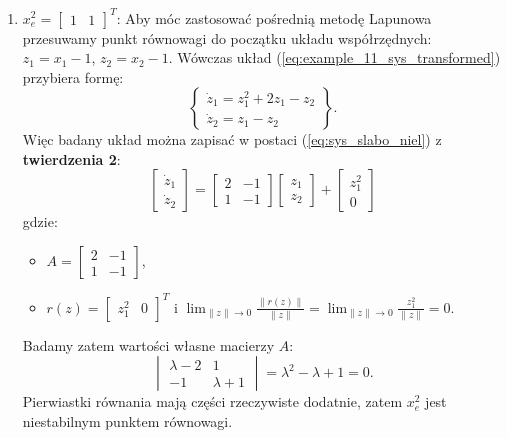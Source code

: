 \documentclass{article}
\begin{document}
\begin{enumerate}
            \item $x_{e}^{2} = \begin{bmatrix} 1 & 1 \end{bmatrix}^{T}$: Aby móc zastosować pośrednią metodę Lapunowa przesuwamy punkt równowagi do początku układu współrzędnych: $z_{1} = x_{1} - 1$, $z_{2} = x_{2} - 1$. Wówczas układ (\ref{eq:example_11_sys_transformed}) przybiera formę:
            $$
                \left\{
                \begin{array}{l}
                     \dot{z}_{1} = z_{1}^{2} + 2z_{1} - z_{2}\\
                     \dot{z}_{2} = z_{1} - z_{2}
                \end{array}
                \right\}.
            $$
            Więc badany układ można zapisać w postaci (\ref{eq:sys_slabo_niel}) z \textbf{twierdzenia 2}:
            $$
                \begin{bmatrix} \dot{z}_{1} \\ \dot{z}_{2} \end{bmatrix}
                =
                \begin{bmatrix} 2 & -1 \\ 1 & -1 \end{bmatrix}
                \begin{bmatrix} z_{1} \\ z_{2} \end{bmatrix}
                +
                \begin{bmatrix} z_{1}^{2} \\ 0 \end{bmatrix}
            $$
            gdzie:
            \begin{itemize}
                \item $A = \begin{bmatrix} 2 & -1 \\ 1 & -1 \end{bmatrix}$,
                \item $r(z) = \begin{bmatrix} z_{1}^{2} & 0 \end{bmatrix}^{T}$ i $\lim_{\lVert z \rVert \rightarrow 0}\frac{\lVert r(z) \rVert}{\lVert z \rVert} = \lim_{\lVert z \rVert \rightarrow 0}\frac{z_{1}^{2}}{\lVert z \rVert} = 0$.
            \end{itemize}
            Badamy zatem wartości własne macierzy $A$:
            $$
                \begin{vmatrix} \lambda-2 & 1\\ -1 & \lambda + 1 \end{vmatrix} = \lambda^{2} - \lambda + 1 = 0.
            $$
            Pierwiastki równania mają części rzeczywiste dodatnie, zatem $x_{e}^{2}$ jest niestabilnym punktem równowagi.
        \end{enumerate}
\end{document}
